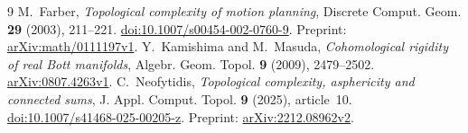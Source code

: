 \documentclass[11pt]{amsart}
\begin{document}
\begin{thebibliography}{9}
M.~Farber, \emph{Topological complexity of motion planning},
Discrete Comput. Geom. \textbf{29} (2003), 211--221.
\href{https://doi.org/10.1007/s00454-002-0760-9}{doi:10.1007/s00454-002-0760-9}.
Preprint: \href{https://arxiv.org/abs/math/0111197}{arXiv:math/0111197v1}.
Y.~Kamishima and M.~Masuda, \emph{Cohomological rigidity of real Bott manifolds},
Algebr. Geom. Topol. \textbf{9} (2009), 2479--2502.
\href{https://arxiv.org/abs/0807.4263v1}{arXiv:0807.4263v1}.
C.~Neofytidis, \emph{Topological complexity, asphericity and connected sums},
J. Appl. Comput. Topol. \textbf{9} (2025), article~10.
\href{https://doi.org/10.1007/s41468-025-00205-z}{doi:10.1007/s41468-025-00205-z}.
Preprint: \href{https://arxiv.org/abs/2212.08962v2}{arXiv:2212.08962v2}.
\end{thebibliography}
\end{document}
